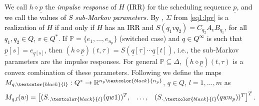 \documentclass[journal,twoside,web]{ieeecolor}
\begin{document}
  We call $h \diamond \underline{p}$ the \textcolor{black}{\emph{impulse response} of $H$ (IRR)}  for the scheduling sequence $\underline{p}$\textcolor{black}{, 
  and we call the values of $S$ \emph{sub-Markov parameters.}}
  \textcolor{black}{By \cite{Petreczky2016}, 
  $\Sigma$ from \eqref{eq1:lpv} is a realization of $H$
  if and only if $H$ has an IRR and $S(q_1vq_2)\!=\!C_{q_2}A_vB_{q_1}$, 
  for all $q_1,q_2 \in Q$, $v \in Q^{*}$.}
  If $\mathbb{P}=\{e_1,\ldots,e_{n_p}\}$ (switched case) and \textcolor{black}{$q \in Q^{\infty}$ is such that}
  $\underline{p}[s]=e_{\underline{q}[s]}$, then
  $(h \diamond \underline{p})(t,\tau)=S(\underline{q}[\tau]\cdots \underline{q}[t])$, i.e., the sub-Markov parameters are the impulse responses.
  For general $\mathbb{P}\subseteq\Delta$, $(h \diamond \underline{p})(t,\tau)$ is a convex combination of these parameters.
  Following \cite{Petreczky2016} we define the \textcolor{black}{maps} $M_{q,\textcolor{black}{l}}: Q^* \to \mathbb{R}^{n_p \textcolor{black}{n_y}}$,
  $q \in Q$, $l=1,\ldots,m$ \textcolor{black}{as} 
   \[
   M_{q,l}(w) = \begin{bmatrix} (S_{\cdot,\textcolor{black}{l}}(qw1))^T, & \ldots, & (S_{\cdot,\textcolor{black}{l}}(qwn_p))^T \end{bmatrix}^T.
  \]
\end{document}
